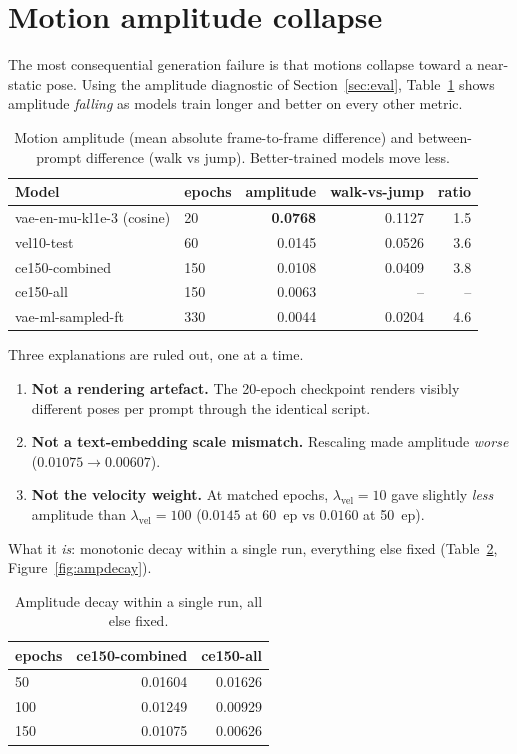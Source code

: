 \documentclass[11pt,a4paper]{report}
\newcommand{\best}[1]{\textbf{#1}}
\newcommand{\lvel}{\ensuremath{\lambda_{\mathrm{vel}}}}
\begin{document}
\section{Motion amplitude collapse}
\label{sec:amplitude}

The most consequential generation failure is that motions collapse toward a
near-static pose. Using the amplitude diagnostic of
Section~\ref{sec:eval}, Table~\ref{tab:amplitude} shows amplitude
\emph{falling} as models train longer and better on every other metric.

\begin{table}[H]
\centering
\caption{Motion amplitude (mean absolute frame-to-frame difference) and
between-prompt difference (walk vs jump). Better-trained models move less.}
\label{tab:amplitude}
\small
\begin{tabular}{@{}llrrr@{}}
\toprule
Model & epochs & amplitude & walk-vs-jump & ratio \\
\midrule
vae-en-mu-kl1e-3 (cosine) & 20  & \best{0.0768} & 0.1127 & 1.5 \\
vel10-test                & 60  & 0.0145 & 0.0526 & 3.6 \\
ce150-combined            & 150 & 0.0108 & 0.0409 & 3.8 \\
ce150-all                 & 150 & 0.0063 & --    & -- \\
vae-ml-sampled-ft         & 330 & 0.0044 & 0.0204 & 4.6 \\
\bottomrule
\end{tabular}
\end{table}

Three explanations are ruled out, one at a time.
\begin{enumerate}[leftmargin=*]
\item \textbf{Not a rendering artefact.} The 20-epoch checkpoint renders
 visibly different poses per prompt through the identical script.
\item \textbf{Not a text-embedding scale mismatch.} Rescaling made
 amplitude \emph{worse} ($0.01075\to0.00607$).
\item \textbf{Not the velocity weight.} At matched epochs, $\lvel=10$ gave
 slightly \emph{less} amplitude than $\lvel=100$ ($0.0145$ at 60~ep vs
 $0.0160$ at 50~ep).
\end{enumerate}

What it \emph{is}: monotonic decay within a single run, everything else
fixed (Table~\ref{tab:amp-decay}, Figure~\ref{fig:ampdecay}).

\begin{table}[H]
\centering
\caption{Amplitude decay within a single run, all else fixed.}
\label{tab:amp-decay}
\small
\begin{tabular}{@{}lrr@{}}
\toprule
epochs & ce150-combined & ce150-all \\
\midrule
50  & 0.01604 & 0.01626 \\
100 & 0.01249 & 0.00929 \\
150 & 0.01075 & 0.00626 \\
\bottomrule
\end{tabular}
\end{table}
\end{document}
